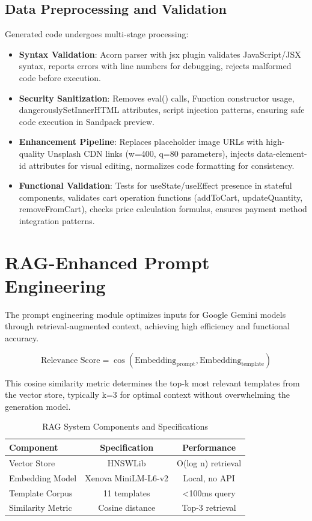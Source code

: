\documentclass[10pt, conference, letterpaper]{IEEEtran}
\begin{document}
\subsection{Data Preprocessing and Validation}
Generated code undergoes multi-stage processing:
\begin{itemize}
    \item \textbf{Syntax Validation}: Acorn parser with jsx plugin validates JavaScript/JSX syntax, reports errors with line numbers for debugging, rejects malformed code before execution.
    \item \textbf{Security Sanitization}: Removes eval() calls, Function constructor usage, dangerouslySetInnerHTML attributes, script injection patterns, ensuring safe code execution in Sandpack preview.
    \item \textbf{Enhancement Pipeline}: Replaces placeholder image URLs with high-quality Unsplash CDN links (w=400, q=80 parameters), injects data-element-id attributes for visual editing, normalizes code formatting for consistency.
    \item \textbf{Functional Validation}: Tests for useState/useEffect presence in stateful components, validates cart operation functions (addToCart, updateQuantity, removeFromCart), checks price calculation formulas, ensures payment method integration patterns.
\end{itemize}

\section{RAG-Enhanced Prompt Engineering}
The prompt engineering module optimizes inputs for Google Gemini models through retrieval-augmented context, achieving high efficiency and functional accuracy.

\begin{equation}
\text{Relevance Score} = \cos(\text{Embedding}_{\text{prompt}}, \text{Embedding}_{\text{template}})
\end{equation}

This cosine similarity metric determines the top-k most relevant templates from the vector store, typically k=3 for optimal context without overwhelming the generation model.

\begin{table}[ht]
\centering
\caption{RAG System Components and Specifications}
\begin{tabular}{|l|c|c|}
\hline
\textbf{Component} & \textbf{Specification} & \textbf{Performance} \\ \hline
Vector Store & HNSWLib & O(log n) retrieval \\ \hline
Embedding Model & Xenova MiniLM-L6-v2 & Local, no API \\ \hline
Template Corpus & 11 templates & <100ms query \\ \hline
Similarity Metric & Cosine distance & Top-3 retrieval \\ \hline
\end{tabular}
\label{tab:rag_specs}
\end{table}
\end{document}
